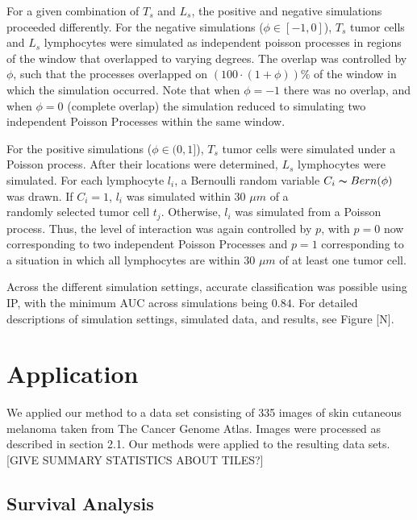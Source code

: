 \documentclass[
]{book}
\begin{document}
For a given combination of \(T_s\) and \(L_s\), the positive and negative
simulations proceeded differently. For the negative simulations
(\(\phi \in [-1, 0]\)), \(T_s\) tumor cells and \(L_s\) lymphocytes were
simulated as independent poisson processes in regions of the window
that overlapped to varying degrees. The overlap was controlled by
\(\phi\), such that the processes overlapped on \((100 \cdot (1 + \phi)) \%\)
of the window in which the simulation occurred. Note that when \(\phi = -1\)
there was no overlap, and when \(\phi = 0\) (complete overlap) the
simulation reduced to simulating two independent Poisson Processes
within the same window.

For the positive simulations (\(\phi \in (0, 1]\)), \(T_s\) tumor cells were
simulated under a Poisson process. After their locations were
determined, \(L_s\) lymphocytes were simulated. For each lymphocyte \(l_i\),
a Bernoulli random variable \(C_i \thicksim Bern(\phi)\) was drawn. If
\(C_i = 1\), \(l_i\) was simulated within \(30\) \(\mu m\) of a\\
randomly selected tumor cell \(t_j\). Otherwise, \(l_i\) was simulated from
a Poisson process. Thus, the level of interaction was again controlled
by \(p\), with \(p = 0\) now corresponding to two independent Poisson
Processes and \(p = 1\) corresponding to a situation in which all
lymphocytes are within \(30\) \(\mu m\) of at least one tumor cell.

Across the different simulation settings, accurate classification was
possible using IP, with the minimum AUC across simulations being \(0.84\).
For detailed descriptions of simulation settings, simulated data, and
results, see Figure {[}N{]}.

\hypertarget{application}{%
\section{Application}\label{application}}

We applied our method to a data set consisting of 335 images of skin
cutaneous melanoma taken from The Cancer Genome Atlas. Images were
processed as described in section 2.1. Our methods were applied to the
resulting data sets. {[}GIVE SUMMARY STATISTICS ABOUT TILES?{]}

\hypertarget{survival-analysis}{%
\subsection{Survival Analysis}\label{survival-analysis}}
\end{document}
